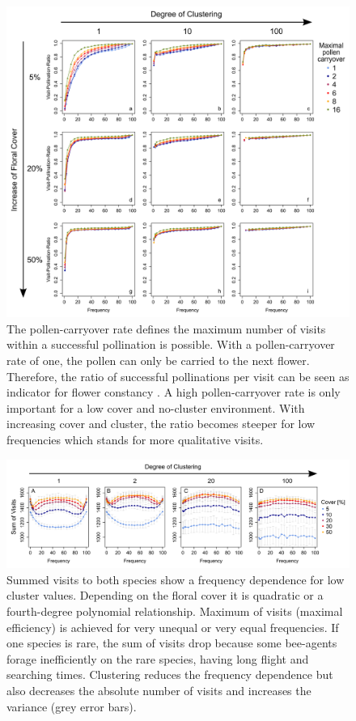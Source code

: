 \begin{figure} [!ht] %
	\centering
	\includegraphics[width=17cm]{Images/POC}
	\caption{The pollen-carryover rate defines the maximum number of visits within a successful pollination is possible. With a pollen-carryover rate of one, the pollen can only be carried to the next flower. Therefore, the ratio of successful pollinations per visit can be seen as indicator for flower constancy \citep{montgomery2009pollen}. A high pollen-carryover rate is only important for a low cover and no-cluster environment. With increasing cover and cluster, the ratio becomes steeper for low frequencies which stands for more qualitative visits.}
	\label{fig:POC}
\end{figure}

\begin{figure} [!ht] %
	\centering
	\includegraphics[width=17cm]{Images/SUM}
	\caption{Summed visits to both species show a frequency dependence for low cluster values. Depending on the floral cover it is quadratic or a fourth-degree polynomial relationship. Maximum of visits (maximal efficiency) is achieved for very unequal or very equal frequencies. If one species is rare, the sum of visits drop because some bee-agents forage inefficiently on the rare species, having long flight and searching times. Clustering reduces the frequency dependence but also decreases the absolute number of visits and increases the variance (grey error bars).}
	\label{fig:SUM}
\end{figure}